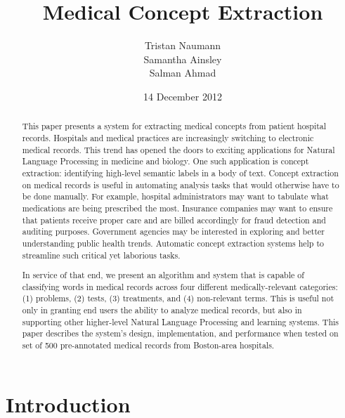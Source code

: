 \documentclass[preprint]{style}
\begin{document}
\title{Medical Concept Extraction}

\author{
\alignauthor
Tristan Naumann\\
\alignauthor
Samantha Ainsley\\
\alignauthor
Salman Ahmad\\
}

\date{14 December 2012}

\maketitle
\begin{abstract}

This paper presents a system for extracting medical concepts from patient hospital records. Hospitals and medical practices are increasingly switching to electronic medical records. This trend has opened the doors to exciting applications for Natural Language Processing in medicine and biology. One such application is concept extraction: identifying high-level semantic labels in a body of text. Concept extraction on medical records is useful in automating analysis tasks that would otherwise have to be done manually. For example, hospital administrators may want to tabulate what medications are being prescribed the most. Insurance companies may want to ensure that patients receive proper care and are billed accordingly for fraud detection and auditing purposes. Government agencies may be interested in exploring and better understanding public health trends. Automatic concept extraction systems help to streamline such critical yet laborious tasks.

In service of that end, we present an algorithm and system that is capable of classifying words in medical records across four different medically-relevant categories: (1) problems, (2) tests, (3) treatments, and (4) non-relevant terms. This is useful not only in granting end users the ability to analyze medical records, but also in supporting other higher-level Natural Language Processing and learning systems. This paper describes the system's design, implementation, and performance when tested on set of 500 pre-annotated medical records from Boston-area hospitals.


\end{abstract}

\section{Introduction}
\end{document}
